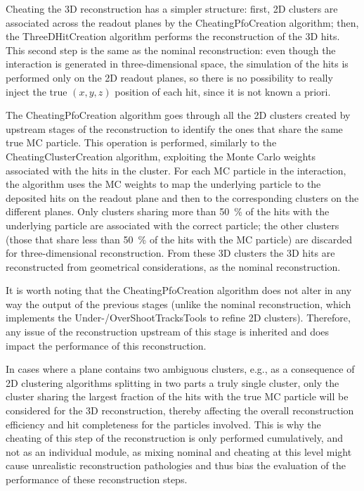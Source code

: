 Cheating the 3D reconstruction has a simpler structure: first, 2D clusters are associated across the readout planes by the CheatingPfoCreation algorithm; then, the ThreeDHitCreation algorithm performs the reconstruction of the 3D hits. This second step is the same as the nominal reconstruction: even though the interaction is generated in three-dimensional space, the simulation of the hits is performed only on the 2D readout planes, so there is no possibility to really inject the true $(x,y,z)$ position of each hit, since it is not known a priori.

The CheatingPfoCreation algorithm goes through all the 2D clusters created by upstream stages of the reconstruction to identify the ones that share the same true MC particle. This operation is performed, similarly to the CheatingClusterCreation algorithm, exploiting the Monte Carlo weights associated with the hits in the cluster. For each MC particle in the interaction, the algorithm uses the MC weights to map the underlying particle to the deposited hits on the readout plane and then to the corresponding clusters on the different planes. Only clusters sharing more than \SI{50}{\percent} of the hits with the underlying particle are associated with the correct particle; the other clusters (those that share less than \SI{50}{\percent} of the hits with the MC particle) are discarded for three-dimensional reconstruction. From these 3D clusters the 3D hits are reconstructed from geometrical considerations, as the nominal reconstruction. 

It is worth noting that the CheatingPfoCreation algorithm does not alter in any way the output of the previous stages (unlike the nominal reconstruction, which implements the Under-/OverShootTracksTools to refine 2D clusters). Therefore, any issue of the reconstruction upstream of this stage is inherited and does impact the performance of this reconstruction. 

In cases where a plane contains two ambiguous clusters, e.g., as a consequence of 2D clustering algorithms splitting in two parts a truly single cluster, only the cluster sharing the largest fraction of the hits with the true MC particle will be considered for the 3D reconstruction, thereby affecting the overall reconstruction efficiency and hit completeness for the particles involved.
This is why the cheating of this step of the reconstruction is only performed cumulatively, and not as an individual module, as mixing nominal and cheating at this level might cause unrealistic reconstruction pathologies and thus bias the evaluation of the performance of these reconstruction steps. 

